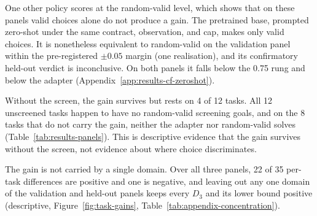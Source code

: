 One other policy scores at the random-valid level, which shows that on these panels valid choices alone do not produce a gain. The pretrained base, prompted zero-shot under the same contract, observation, and cap, makes only valid choices. It is nonetheless equivalent to random-valid on the validation panel within the pre-registered $\pm 0.05$ margin (one realisation), and its confirmatory held-out verdict is inconclusive. On both panels it falls below the 0.75 rung and below the adapter (Appendix~\ref{app:results-cf-zeroshot}).

Without the screen, the gain survives but rests on 4 of 12 tasks. All 12 unscreened tasks happen to have no random-valid screening goals, and on the 8 tasks that do not carry the gain, neither the adapter nor random-valid solves (Table~\ref{tab:results-panels}). This is descriptive evidence that the gain survives without the screen, not evidence about where choice discriminates.

The gain is not carried by a single domain. Over all three panels, 22 of 35 per-task differences are positive and one is negative, and leaving out any one domain of the validation and held-out panels keeps every $D_3$ and its lower bound positive (descriptive, Figure~\ref{fig:task-gains}, Table~\ref{tab:appendix-concentration}).


